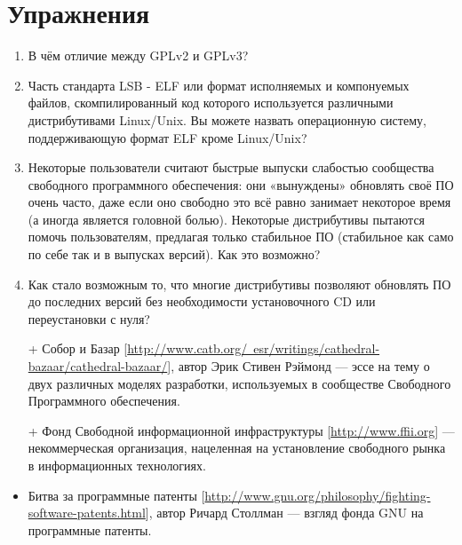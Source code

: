 \documentclass[12pt]{book}
\begin{document}
\newpage
{\color{white}\section{Упражнения}}
\begin{tcolorbox}[title=\textbf{Упражнения}, colback=yellow!14!white, colframe=red!75!white]
\begin{enumerate}
	\item В чём отличие между GPLv2 и GPLv3?
	\item Часть стандарта LSB  - ELF или формат исполняемых и компонуемых файлов, скомпилированный код которого используется различными дистрибутивами Linux/Unix. Вы можете назвать операционную систему, поддерживающую формат ELF кроме Linux/Unix?
	\item Некоторые пользователи считают быстрые выпуски слабостью сообщества свободного программного обеспечения: они «вынуждены» обновлять своё ПО очень часто, даже если оно свободно это всё равно занимает некоторое время (а иногда является головной болью). Некоторые дистрибутивы пытаются помочь пользователям, предлагая только стабильное ПО (стабильное как само по себе так и в выпусках версий). Как это возможно?
	\item Как стало возможным то, что многие дистрибутивы позволяют обновлять ПО до последних версий без необходимости установочного CD или переустановки с нуля?
\end{enumerate}
\end{tcolorbox}

\phantom{}
\begin{tcolorbox}[title=\textbf{Дальнейшие ресурсы}, colback=yellow!14!white, colframe=red!75!blue]
\begin{itemize}
	\item[+] Собор и Базар  [\href{http://www.catb.org/~esr/writings/cathedral-bazaar/cathedral-bazaar/}{http://www.catb.org/~esr/writings/cathedral-bazaar/cathedral-bazaar/}], автор Эрик Стивен Рэймонд — эссе на тему о двух различных моделях разработки, используемых в сообществе Свободного Программного обеспечения.
	\item[+] Фонд Свободной  информационной инфраструктуры  [\href{http://www.ffii.org}{http://www.ffii.org}] — некоммерческая организация, нацеленная на установление свободного рынка в информационных технологиях.
	\item Битва за программные патенты [\href{http://www.gnu.org/philosophy/fighting-software-patents.html}{http://www.gnu.org/philosophy/fighting-software-patents.html}], автор Ричард Столлман — взгляд фонда GNU на программные патенты.
\end{itemize}
\end{tcolorbox}
\end{document}
